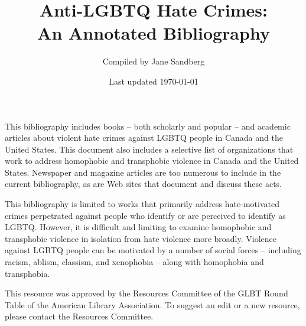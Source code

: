 \documentclass[12pt]{article}
\title{Anti-LGBTQ Hate Crimes: \\An Annotated Bibliography}
\author{Compiled by Jane Sandberg}
\date{Last updated \today}
\begin{document}
\maketitle

 
 This bibliography includes books -- both scholarly and popular -- and academic articles about violent hate crimes against LGBTQ people in Canada and the United States.  This document also includes a selective list of organizations that work to address homophobic and transphobic violence in Canada and the United States.  Newspaper and magazine articles are too numerous to include in the current bibliography, as are Web sites that document and discuss these acts.
 
 This bibliography is limited to works that primarily address hate-motivated crimes perpetrated against people who identify or are perceived to identify as LGBTQ.  However, it is difficult and limiting to examine homophobic and transphobic violence in isolation from hate violence more broadly.  Violence against LGBTQ people can be motivated by a number of social forces -- including racism, ablism, classism, and xenophobia -- along with homophobia and transphobia.
 
 This resource was approved by the Resources Committee of the GLBT Round Table of the American Library Association. To suggest an edit or a new resource, please contact the Resources Committee.

 \newpage
 \tableofcontents
 \newpage

 
 \nocite{*}
 
\end{document}
